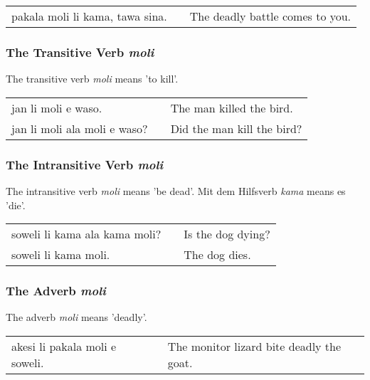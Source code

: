 \begin{supertabular}{p{5,5cm}|ll}
pakala moli li kama, tawa sina. && The deadly battle comes to you. \\
\end{supertabular} 

%
%
\subsubsection*{The Transitive Verb \textit{moli}}
%
%
The transitive verb \textit{moli} means 'to kill'.

\begin{supertabular}{p{5,5cm}|ll}
jan li moli e waso. && The man killed the bird. \\
jan li moli ala moli e waso? && Did the man kill the bird? \\
\end{supertabular} 

%
%
\subsubsection*{The Intransitive Verb \textit{moli}}
%
%

The intransitive verb \textit{moli} means 'be dead'.
Mit dem Hilfsverb \textit{kama} means es 'die'. 

\begin{supertabular}{p{5,5cm}|ll}
soweli li kama ala kama moli? && Is the dog dying? \\
soweli li kama moli. && The dog dies. \\
\end{supertabular} 

%
%
\subsubsection*{The Adverb \textit{moli}}
%
%
The adverb \textit{moli} means 'deadly'. 

\begin{supertabular}{p{5,5cm}|ll}
akesi li pakala moli e soweli. && The monitor lizard bite deadly the goat. \\
\end{supertabular} 

